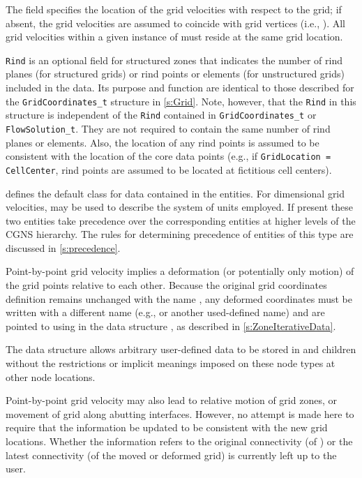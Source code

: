 The field  specifies the location of the grid
velocities with respect to the grid; if absent, the grid velocities
are assumed to coincide with grid vertices (i.e., ).
All grid velocities within a given instance of
 must reside at the same grid location.

\texttt{Rind} is an optional field for structured zones that indicates
the number of rind planes (for structured grids) or rind points or
elements (for unstructured grids) included in the data.
Its purpose and function are identical to those described for the
\texttt{GridCoordinates\_t} structure in \autoref{s:Grid}.
Note, however, that the \texttt{Rind} in this structure is independent
of the \texttt{Rind} contained in \texttt{GridCoordinates\_t} or
\texttt{FlowSolution\_t}.
They are not required to contain the same number of rind planes or
elements.
Also, the location of any rind points is assumed to be consistent with
the location of the core data points (e.g., if \texttt{GridLocation =
CellCenter}, rind points are assumed to be located at fictitious cell
centers).

 defines the default class for data contained in the
 entities.
For dimensional grid velocities,  may be used to
describe the system of units employed.
If present these two entities take precedence over the corresponding
entities at higher levels of the CGNS hierarchy.
The rules for determining precedence of entities of this type are
discussed in \autoref{s:precedence}.

Point-by-point grid velocity implies a deformation (or potentially only
motion) of the grid points relative to each other.
Because the original grid coordinates definition remains
unchanged with the name , any deformed
coordinates must be written with a different name (e.g.,
 or another used-defined name) and are pointed
to using  in the data structure
, as described in \autoref{s:ZoneIterativeData}.

The  data structure allows arbitrary
user-defined data to be stored in  and
 children without the restrictions or implicit
meanings imposed on these node types at other node locations.

Point-by-point grid velocity may also lead to relative motion of grid
zones, or movement of grid along abutting interfaces.
However, no attempt is made here to require that the
 information be updated to be consistent
with the new grid locations.
Whether the  information refers to
the original connectivity (of ) or the latest
connectivity (of the moved or deformed grid) is currently left up to the
user.

